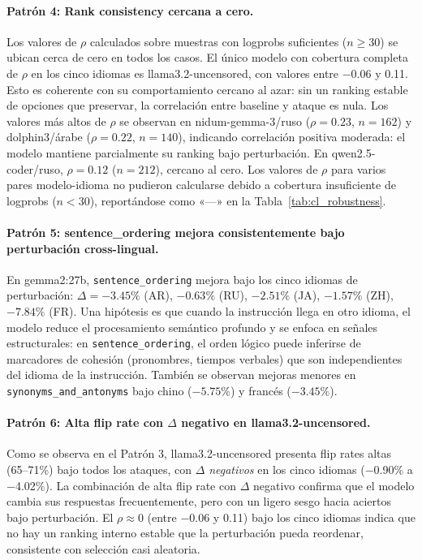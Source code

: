 \documentclass[11pt]{article}
\begin{document}
\paragraph{Patrón 4: Rank consistency cercana a cero.}
Los valores de $\rho$ calculados sobre muestras con logprobs
suficientes ($n \geq 30$) se ubican cerca de cero en todos los casos.
El único modelo con cobertura completa de $\rho$ en los cinco idiomas
es llama3.2-uncensored, con valores entre $-$0.06 y 0.11. Esto es
coherente con su comportamiento cercano al azar: sin un ranking
estable de opciones que preservar, la correlación entre baseline y
ataque es nula. Los valores más altos de $\rho$ se observan en
nidum-gemma-3/ruso ($\rho = 0.23$, $n = 162$) y dolphin3/árabe
($\rho = 0.22$, $n = 140$), indicando correlación positiva moderada:
el modelo mantiene parcialmente su ranking bajo perturbación. En
qwen2.5-coder/ruso, $\rho = 0.12$ ($n = 212$), cercano al cero. Los
valores de $\rho$ para varios pares modelo-idioma no pudieron
calcularse debido a cobertura insuficiente de logprobs ($n < 30$),
reportándose como «—» en la Tabla~\ref{tab:cl_robustness}.
 
\paragraph{Patrón 5: sentence\_ordering mejora consistentemente bajo
perturbación cross-lingual.}
En gemma2:27b, \texttt{sentence\_ordering} mejora bajo los cinco idiomas
de perturbación: $\Delta = -3.45\%$ (AR), $-0.63\%$ (RU), $-2.51\%$
(JA), $-1.57\%$ (ZH), $-7.84\%$ (FR). Una hipótesis es que cuando la
instrucción llega en otro idioma, el modelo reduce el procesamiento
semántico profundo y se enfoca en señales estructurales: en
\texttt{sentence\_ordering}, el orden lógico puede inferirse de
marcadores de cohesión (pronombres, tiempos verbales) que son
independientes del idioma de la instrucción. También se observan mejoras
menores en \texttt{synonyms\_and\_antonyms} bajo chino ($-5.75\%$) y
francés ($-3.45\%$).
 
\paragraph{Patrón 6: Alta flip rate con $\Delta$ negativo en
llama3.2-uncensored.}
Como se observa en el Patrón 3, llama3.2-uncensored presenta flip rates
altas (65--71\%) bajo todos los ataques, con $\Delta$ \textit{negativos}
en los cinco idiomas ($-$0.90\% a $-$4.02\%). La combinación de alta
flip rate con $\Delta$ negativo confirma que el modelo cambia sus
respuestas frecuentemente, pero con un ligero sesgo hacia aciertos bajo
perturbación. El $\rho \approx 0$ (entre $-$0.06 y 0.11) bajo los cinco
idiomas indica que no hay un ranking interno estable que la perturbación
pueda reordenar, consistente con selección casi aleatoria.
 
\end{document}
